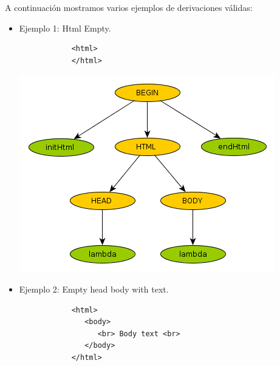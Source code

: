 
A continuaci\'on mostramos varios ejemplos de derivaciones v\'alidas:

  \begin{itemize}

	\item{  Ejemplo 1: Html Empty.
		\begin{verbatim}
			<html>
			</html> 
		\end{verbatim}
	}


\begin{center}
	\includegraphics[scale=0.5]{Imagenes/1_html_empty.png}\\
\end{center}

	\item{  Ejemplo 2: Empty head body with text.
		\begin{verbatim}
			<html> 
			   <body> 
			      <br> Body text <br> 
			   </body> 
			</html> 
		\end{verbatim}
	}


\end{itemize}

